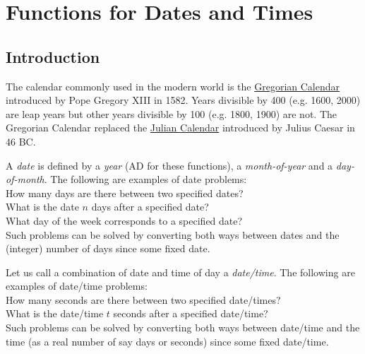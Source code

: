 
\section{Functions for Dates and Times}
    \label{date-function}

\subsection{Introduction}
        \label{date-function-Introduction}

The calendar commonly used in the modern world is the 
      \href{http://scienceworld.wolfram.com/astronomy/GregorianCalendar.html}{ Gregorian Calendar} introduced by Pope Gregory XIII in 1582.
      Years divisible by 400 (e.g. 1600, 2000) are leap years but other
      years divisible by 100 (e.g. 1800, 1900) are not. The Gregorian
      Calendar replaced the 
      \href{http://scienceworld.wolfram.com/astronomy/JulianCalendar.html}{ Julian Calendar} introduced by Julius Caesar in 46 BC.
      

A 
      \emph{date} is defined by a 
      \emph{year} (AD for these functions), a 
      \emph{month-of-year} and a 
      \emph{day-of-month}. The following are examples of date
      problems:
      \\How many days are there between two specified dates?
      \\What is the date 
      $n$ days after a specified date?
      \\What day of the week corresponds to a specified date?
      \\Such problems can be solved by converting both ways between
      dates and the (integer) number of days since some fixed date.
      

Let us call a combination of date and time of day a 
      \emph{date/time}. The following are examples of date/time
      problems:
      \\How many seconds are there between two specified
      date/times?
      \\What is the date/time 
      $t$ seconds after a specified date/time?
      \\Such problems can be solved by converting both ways between
      date/time and the time (as a real number of say days or seconds)
      since some fixed date/time.
      

